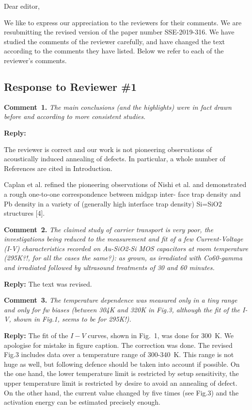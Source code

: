 \documentclass[aip,jap,preprint]{revtex4-1}
\begin{document}
Dear editor,

We like to express our appreciation to the reviewers for their comments.
We are resubmitting the revised version of the paper number  SSE-2019-316.
We have studied the comments of the reviewer carefully, and have changed the text according to the comments they
have listed.
Below we refer to each of the reviewer’s comments.



\subsection*{Response to Reviewer \#1 }

\noindent
\textcolor[rgb]{0.00,0.50,1.00}{\textbf{Comment~1.}}
\emph{The main conclusions (and the highlights) were in fact drawn before and according to more consistent studies.}

\noindent
\textcolor[rgb]{0.51,0.00,0.00}{\textbf{Reply:}}

The reviewer is correct and our work is not pioneering observations of acoustically induced annealing of defects.
In particular, a whole number of References are cited in Introduction.


Caplan et al. refined the pioneering observations of
Nishi et al. and demonstrated a rough one-to-one correspondence between midgap inter-
face trap density and Pb density in a variety of (generally high interface trap density)
Si=SiO2 structures [4].



\noindent
\textcolor[rgb]{0.00,0.50,1.00}{\textbf{Comment~2.}}
\emph{The claimed study of carrier transport is very poor, the investigations being reduced to the measurement and fit of a few Current-Voltage (I-V) characteristics recorded on Au-SiO2-Si MOS capacitors at room temperature (295K?!, for all the cases the same?): as grown, as irradiated with Co60-gamma and irradiated followed by ultrasound treatments of 30 and 60 minutes.}

\noindent
\textcolor[rgb]{0.51,0.00,0.00}{\textbf{Reply:}}
The text was revised.



\noindent
\textcolor[rgb]{0.00,0.50,1.00}{\textbf{Comment~3.}}
\emph{The temperature dependence was measured only in a tiny range and only for fw biases (between 304K and 320K in Fig.3, although the fit of the I-V, shown in Fig.1, seems to be for 295K!).}


\noindent
\textcolor[rgb]{0.51,0.00,0.00}{\textbf{Reply:}}
The fit of the $I-V$ curves, shown in Fig.~1, was done for 300~K.
We apologise for mistake in figure caption. 
The correction was done.
The revised Fig.3 includes data over a temperature range of 300-340~K.
This range is not huge as well, but following defence should be taken into account if possible.
On the one hand, the lower temperature limit is restricted by setup sensitivity,
the upper temperature limit is restricted by desire to avoid an annealing of defect.
On the other hand, the current value  changed by five times (see Fig.3)
and the activation energy can be estimated precisely enough. 
\end{document}
